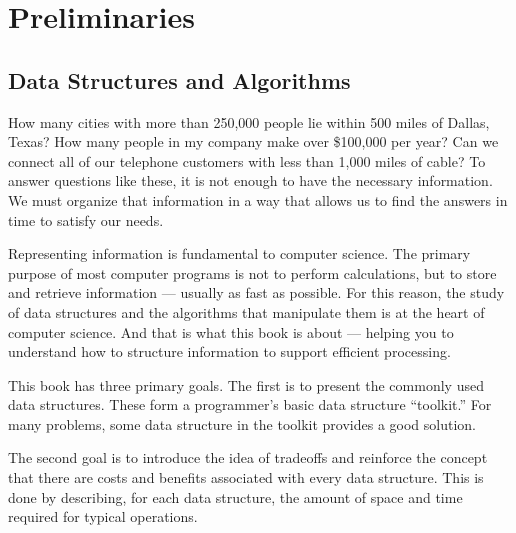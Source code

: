 
\part{Preliminaries}
\label{Prelims}
\mycleardoublepage

\chapter{Data Structures and Algorithms}
\label{Intro}
\def\CHHEAD{Chap.\ \thechapter\ Data Structures and Algorithms}    %



How many cities with more than 250,000 people lie within 500 miles of
Dallas, Texas?
How many people in my company make over \$100,000 per year?
Can we connect all of our telephone customers with less than 1,000
miles of cable?
To answer questions like these, it is not enough to have the
necessary information.
We must organize that information in a way that allows us to find the
answers in time to satisfy our needs.

Representing information is fundamental to computer science.
The primary purpose of most computer programs is not to
perform calculations, but to store and retrieve information ---
usually as fast as possible.
For this reason, the study of data structures and the algorithms that
manipulate them is at the heart of computer science.
And that is what this book is about --- helping you to understand how
to structure information to support efficient processing.

This book has three primary goals.
The first is to present the commonly used data structures.
These form a programmer's basic data structure ``toolkit.''
For many problems, some data structure in the toolkit provides a good solution.

The second goal is to introduce the idea of tradeoffs
and reinforce the concept that there are costs and benefits associated
with every data structure.
This is done by describing, for each data structure, the amount of
space and time required for typical operations.

